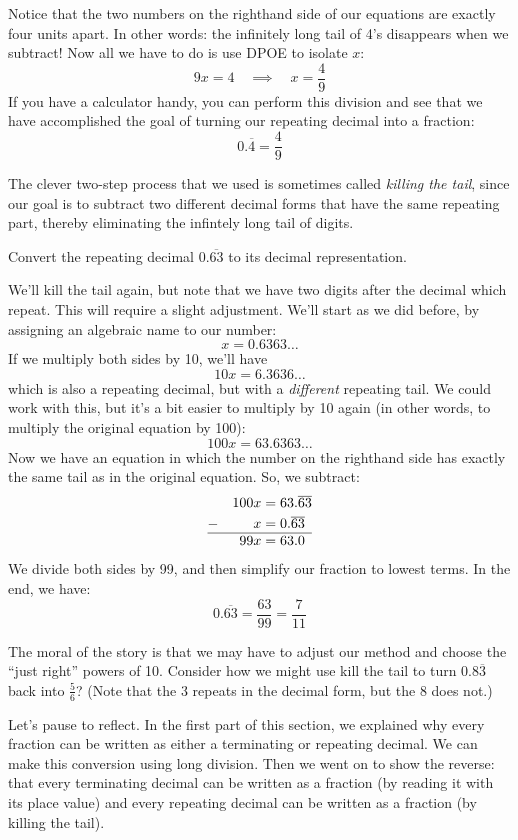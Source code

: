 Notice that the two numbers on the righthand side of our equations are exactly four units apart. In other words: the infinitely long tail of 4's disappears when we subtract! Now all we have to do is use DPOE to isolate $x$: \[9x = 4 \quad\implies\quad x = \frac{4}{9}\] If you have a calculator handy, you can perform this division and see that we have accomplished the goal of turning our repeating decimal into a fraction:\[0.\overline{4} = \frac{4}{9}\]

The clever two-step process that we used is sometimes called \textit{killing the tail}, since our goal is to subtract two different decimal forms that have the same repeating part, thereby eliminating the infintely long tail of digits.

\begin{boxedex}
Convert the repeating decimal $0.\overline{63}$ to its decimal representation.

\bigskip{} We'll kill the tail again, but note that we have two digits after the decimal which repeat. This will require a slight adjustment. We'll start as we did before, by assigning an algebraic name to our number:\[x = 0.6363\dotso\]
If we multiply both sides by 10, we'll have \[10x = 6.3636\dotso\] which is also a repeating decimal, but with a \textit{different} repeating tail. We could work with this, but it's a bit easier to multiply by 10 again (in other words, to multiply the original equation by 100): \[100x = 63.6363\dotso\] Now we have an equation in which the number on the righthand side has exactly the same tail as in the original equation. So, we subtract:
\[\begin{aligned}
	&&	100x &= 63.\overline{63}\\
- 	&& 	x 	&= 0.\overline{63}\\\hline
	&&	99x 	&= 63.0
\end{aligned}\] We divide both sides by 99, and then simplify our fraction to lowest terms. In the end, we have: \[0.\overline{63} = \frac{63}{99} = \frac{7}{11}\]
\end{boxedex}

The moral of the story is that we may have to adjust our method and choose the ``just right'' powers of 10. Consider how we might use kill the tail to turn $0.8\overline{3}$ back into $\frac{5}{6}$? (Note that the 3 repeats in the decimal form, but the 8 does not.)

Let's pause to reflect. In the first part of this section, we explained why every fraction can be written as either a terminating or repeating decimal. We can make this conversion using long division. Then we went on to show the reverse: that every terminating decimal can be written as a fraction (by reading it with its place value) and every repeating decimal can be written as a fraction (by killing the tail).

